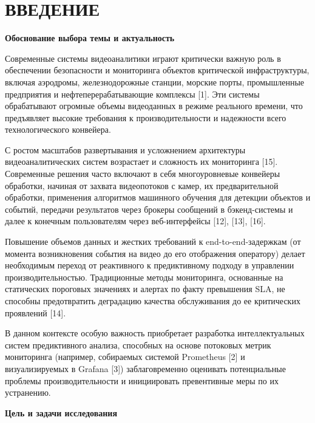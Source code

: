 \newpage
\chapter*{ВВЕДЕНИЕ}  


\textbf{Обоснование выбора темы и актуальность}

\hspace*{1.25cm}Современные системы видеоаналитики играют критически важную роль в обеспечении безопасности и мониторинга объектов критической инфраструктуры, включая аэродромы, железнодорожные станции, морские порты, промышленные предприятия и нефтеперерабатывающие комплексы [1]. Эти системы обрабатывают огромные объемы видеоданных в режиме реального времени, что предъявляет высокие требования к производительности и надежности всего технологического конвейера.

\hspace*{1.25cm}С ростом масштабов развертывания и усложнением архитектуры видеоаналитических систем возрастает и сложность их мониторинга [15]. Современные решения часто включают в себя многоуровневые конвейеры обработки, начиная от захвата видеопотоков с камер, их предварительной обработки, применения алгоритмов машинного обучения для детекции объектов и событий, передачи результатов через брокеры сообщений в бэкенд-системы и далее к конечным пользователям через веб-интерфейсы [12], [13], [16].

\hspace*{1.25cm}Повышение объемов данных и жестких требований к end-to-end-задержкам (от момента возникновения события на видео до его отображения оператору) делает необходимым переход от реактивного к предиктивному подходу в управлении производительностью. Традиционные методы мониторинга, основанные на статических пороговых значениях и алертах по факту превышения SLA, не способны предотвратить деградацию качества обслуживания до ее критических проявлений [14].

\hspace*{1.25cm}В данном контексте особую важность приобретает разработка интеллектуальных систем предиктивного анализа, способных на основе потоковых метрик мониторинга (например, собираемых системой Prometheus [2] и визуализируемых в Grafana [3]) заблаговременно оценивать потенциальные проблемы производительности и инициировать превентивные меры по их устранению.

\textbf{Цель и задачи исследования}


